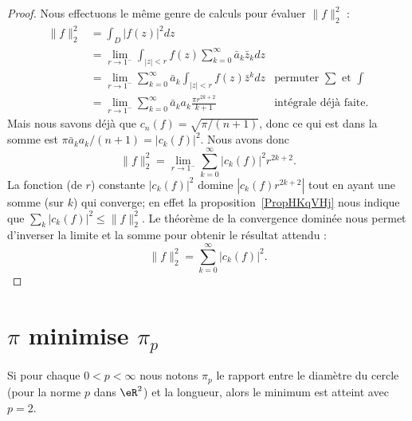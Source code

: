 \begin{proof}
	Nous effectuons le même genre de calculs pour évaluer \( \| f \|^2_2\) :
	\begin{subequations}
		\begin{align}
			\| f \|_2^2 & =\int_D| f(z) |^2dz                                                                                                \\
			            & =\lim_{r\to 1^-}\int_{| z |<r}f(z)\sum_{k=0}^{\infty}\bar a_k\bar z_kdz                                            \\
			            & =\lim_{r\to 1^-}\sum_{k=0}^{\infty}\bar a_k\int_{| z |<r}f(z)\bar z^kdz    & \text{permuter } \sum\text{ et } \int \\
			            & =\lim_{r\to 1^-}\sum_{k=0}^{\infty}\bar a_ka_k\frac{ \pi r^{2k+2} }{ k+1 } & \text{intégrale déjà faite}.
		\end{align}
	\end{subequations}
	Mais nous savons déjà que \( c_n(f)=\sqrt{\pi/(n+1)}\), donc ce qui est dans la somme est \( \pi\bar a_ka_k/(n+1)=| c_k(f) |^2\). Nous avons donc
	\begin{equation}
		\| f \|^2_2=\lim_{r\to 1^-}\sum_{k=0}^{\infty}| c_k(f) |^2 r^{2k+2}.
	\end{equation}
	La fonction (de \( r\)) constante \( | c_k(f) |^2\) domine \( | c_k(f)r^{2k+2} |\) tout en ayant une somme (sur \( k\)) qui converge; en effet la proposition~\ref{PropHKqVHj} nous indique que \( \sum_k| c_k(f) |^2\leq \| f \|_2^2\). Le théorème de la convergence dominée nous permet d'inverser la limite et la somme pour obtenir le résultat attendu :
	\begin{equation}
		\| f \|_2^2=\sum_{k=0}^{\infty}| c_k(f) |^2.
	\end{equation}
\end{proof}


\section{\( \pi\) minimise \( \pi_p\)}

\begin{proposition}	\label{PROPooPAJXooHOpYrl}
	Si pour chaque \( 0<p<\infty\) nous notons \( \pi_p\) le rapport entre le diamètre du cercle (pour la norme \( p\) dans \( \eR^2\)) et la longueur, alors le minimum est atteint avec \( p=2\).
\end{proposition}
